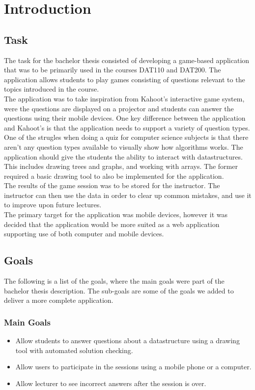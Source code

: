 \section{Introduction}
\subsection{Task}
The task for the bachelor thesis consisted of developing a game-based application that was to be primarily used in the courses DAT110 and DAT200. The application allows students to play games consisting of questions relevant to the topics introduced in the course.
\\[11pt]
The application was to take inspiration from Kahoot's interactive game system\cite{Kahoot}, were the questions are displayed on a projector and students can answer the questions using their mobile devices. One key difference between the application and Kahoot's is that the application needs to support a variety of question types. One of the strugles when doing a quiz for computer science subjects is that there aren't any question types available to visually show how algorithms works. The application should give the students the ability to interact with datastructures. This includes drawing trees and graphs, and working with arrays. The former required a basic drawing tool to also be implemented for the application.
\\[11pt] 
The results of the game session was to be stored for the instructor. The instructor can then use the data in order to clear up common mistakes, and use it to improve upon future lectures.
\\[11pt]
The primary target for the application was mobile devices, however it was decided that the application would be more suited as a web application supporting use of both computer and mobile devices. 

\subsection{Goals}
The following is a list of the goals, where the main goals were part of the bachelor thesis description. The sub-goals are some of the goals we added to deliver a more complete application.
\subsubsection{Main Goals}
\begin{itemize}
\item Allow students to answer questions about a datastructure using a drawing tool with automated solution checking.
\item Allow users to participate in the sessions using a mobile phone or a computer.
\item Allow lecturer to see incorrect answers after the session is over.
\end{itemize}
